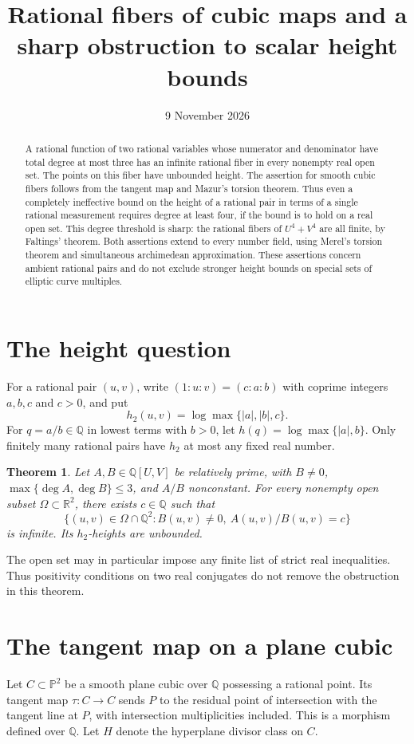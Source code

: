 \documentclass[11pt]{article}
\title{Rational fibers of cubic maps and a sharp obstruction to scalar height bounds}
\author{}
\date{9 November 2026}
\newtheorem{theorem}{Theorem}[section]
\theoremstyle{remark}\newtheorem{remark}[theorem]{Remark}
\newcommand{\Q}{\mathbb Q}\newcommand{\R}{\mathbb R}
\newcommand{\PP}{\mathbb P}\newcommand{\Affine}{\mathbb A}
\begin{document}
\maketitle
\begin{abstract}
A rational function of two rational variables whose numerator and denominator
have total degree at most three has an infinite rational fiber in every
nonempty real open set.  The points on this fiber have unbounded height.
The assertion for smooth cubic fibers follows from the tangent map and
Mazur's torsion theorem.  Thus even a completely ineffective bound on the
height of a rational pair in terms of a single rational measurement requires
degree at least four, if the bound is to hold on a real open set.
This degree threshold is sharp: the rational fibers of $U^4+V^4$ are all
finite, by Faltings' theorem.  Both assertions extend to every number
field, using Merel's torsion theorem and simultaneous archimedean
approximation.  These assertions concern ambient rational
pairs and do not exclude stronger height bounds on special sets of elliptic
curve multiples.
\end{abstract}

\section{The height question}
For a rational pair $(u,v)$, write $(1:u:v)=(c:a:b)$ with coprime integers
$a,b,c$ and $c>0$, and put
\[
h_2(u,v)=\log\max\{|a|,|b|,c\}.
\]
For $q=a/b\in\Q$ in lowest terms with $b>0$, let
$h(q)=\log\max\{|a|,b\}$.  Only finitely many rational pairs have
$h_2$ at most any fixed real number.

\begin{theorem}\label{thm:main}
Let $A,B\in\Q[U,V]$ be relatively prime, with $B\ne0$,
$\max\{\deg A,\deg B\}\le3$, and $A/B$ nonconstant.
For every nonempty open subset $\Omega\subset\R^2$, there exists $c\in\Q$
such that
\[
\{(u,v)\in\Omega\cap\Q^2:B(u,v)\ne0,\ A(u,v)/B(u,v)=c\}
\]
is infinite.  Its $h_2$-heights are unbounded.
\end{theorem}

The open set may in particular impose any finite list of strict real
inequalities.  Thus positivity conditions on two real conjugates do not
remove the obstruction in this theorem.

\section{The tangent map on a plane cubic}
Let $C\subset\PP^2$ be a smooth plane cubic over $\Q$ possessing a rational
point.  Its tangent map $\tau:C\to C$ sends $P$ to the residual point of
intersection with the tangent line at $P$, with intersection multiplicities
included.  This is a morphism defined over $\Q$.  Let $H$ denote the
hyperplane divisor class on $C$.
\end{document}
